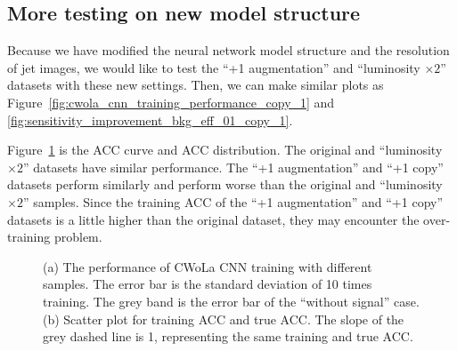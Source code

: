 \documentclass[12pt]{article}
\begin{document}
	\subsection{More testing on new model structure}%
	\label{sub:more_testing_on_new_model_structure}
		Because we have modified the neural network model structure and the resolution of jet images, we would like to test the ``+1 augmentation'' and ``luminosity $\times 2$'' datasets with these new settings. Then, we can make similar plots as Figure~\ref{fig:cwola_cnn_training_performance_copy_1} and \ref{fig:sensitivity_improvement_bkg_eff_01_copy_1}.

		Figure~\ref{fig:cwola_cnn_training_performance_aug_1_x2_copy_1_res_25} is the ACC curve and ACC distribution. The original and ``luminosity $\times 2$'' datasets have similar performance. The ``+1 augmentation'' and ``+1 copy'' datasets perform similarly and perform worse than the original and ``luminosity $\times 2$'' samples. Since the training ACC of the ``+1 augmentation'' and ``+1 copy'' datasets is a little higher than the original dataset, they may encounter the over-training problem.
		\begin{figure}[htpb]
			\centering
			\caption{(a) The performance of CWoLa CNN training with different samples. The error bar is the standard deviation of 10 times training. The grey band is the error bar of the ``without signal'' case. (b) Scatter plot for training ACC and true ACC. The slope of the grey dashed line is 1, representing the same training and true ACC.}
			\label{fig:cwola_cnn_training_performance_aug_1_x2_copy_1_res_25}
		\end{figure}
\end{document}
